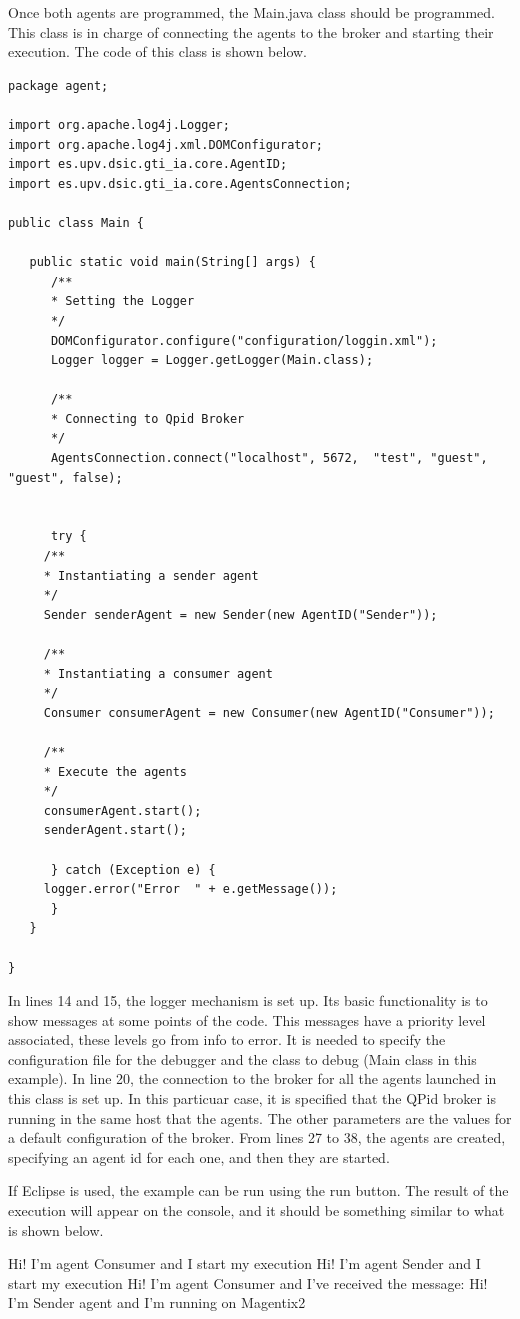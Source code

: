 Once both agents are programmed, the Main.java class should be programmed. This class is in charge of connecting the agents to the broker and starting their execution. The code of this class is shown below.

\begin{lstlisting}[style=Java]
package agent;

import org.apache.log4j.Logger;
import org.apache.log4j.xml.DOMConfigurator;
import es.upv.dsic.gti_ia.core.AgentID;
import es.upv.dsic.gti_ia.core.AgentsConnection;

public class Main {

   public static void main(String[] args) {
      /**
      * Setting the Logger
      */
      DOMConfigurator.configure("configuration/loggin.xml");
      Logger logger = Logger.getLogger(Main.class);

      /**
      * Connecting to Qpid Broker
      */
      AgentsConnection.connect("localhost", 5672,  "test", "guest", "guest", false);


      try {
	 /**
	 * Instantiating a sender agent
	 */
	 Sender senderAgent = new Sender(new AgentID("Sender"));

	 /**
	 * Instantiating a consumer agent
	 */
	 Consumer consumerAgent = new Consumer(new AgentID("Consumer"));

	 /**
	 * Execute the agents
	 */
	 consumerAgent.start();
	 senderAgent.start();

      } catch (Exception e) {
	 logger.error("Error  " + e.getMessage());
      }
   }

}
\end{lstlisting}
In lines 14 and 15, the logger mechanism is set up. Its basic functionality is to show messages at some points of the code. This messages have a priority level associated, these levels go from info to error. It is needed to specify the configuration file for the debugger and the class to debug (Main class in this example). In line 20, the connection to the broker for all the agents launched in this class is set up. In this particuar case, it is  specified that the QPid broker is running in the same host that the agents. The other parameters are the values for a default configuration of the broker. From lines 27 to 38, the agents are created, specifying an agent id for each one, and then they are started.

If Eclipse is used, the example can be run using the run button. The result of the execution will appear on the console, and it should be something similar to what is shown below.
\begin{codigo}
Hi! I'm agent Consumer and I start my execution
Hi! I'm agent Sender and I start my execution
Hi! I'm agent Consumer and I've received the message: Hi! I'm Sender
agent and I'm running on Magentix2
\end{codigo}




